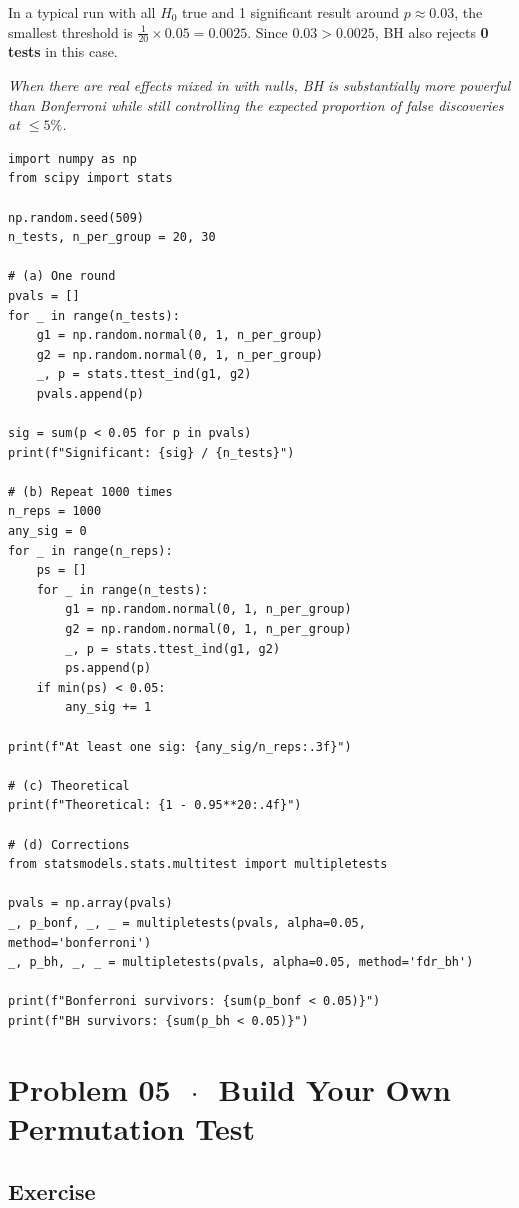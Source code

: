 \documentclass[11pt]{article}
\begin{document}
In a typical run with all $H_0$ true and 1 significant result around $p \approx 0.03$, the smallest threshold is $\frac{1}{20} \times 0.05 = 0.0025$. Since $0.03 > 0.0025$, BH also rejects \textbf{0 tests} in this case.

\textit{When there are real effects mixed in with nulls, BH is substantially more powerful than Bonferroni while still controlling the expected proportion of false discoveries at $\leq 5\%$.}

\begin{lstlisting}[style=python]
import numpy as np
from scipy import stats

np.random.seed(509)
n_tests, n_per_group = 20, 30

# (a) One round
pvals = []
for _ in range(n_tests):
    g1 = np.random.normal(0, 1, n_per_group)
    g2 = np.random.normal(0, 1, n_per_group)
    _, p = stats.ttest_ind(g1, g2)
    pvals.append(p)

sig = sum(p < 0.05 for p in pvals)
print(f"Significant: {sig} / {n_tests}")

# (b) Repeat 1000 times
n_reps = 1000
any_sig = 0
for _ in range(n_reps):
    ps = []
    for _ in range(n_tests):
        g1 = np.random.normal(0, 1, n_per_group)
        g2 = np.random.normal(0, 1, n_per_group)
        _, p = stats.ttest_ind(g1, g2)
        ps.append(p)
    if min(ps) < 0.05:
        any_sig += 1

print(f"At least one sig: {any_sig/n_reps:.3f}")

# (c) Theoretical
print(f"Theoretical: {1 - 0.95**20:.4f}")

# (d) Corrections
from statsmodels.stats.multitest import multipletests

pvals = np.array(pvals)
_, p_bonf, _, _ = multipletests(pvals, alpha=0.05, method='bonferroni')
_, p_bh, _, _ = multipletests(pvals, alpha=0.05, method='fdr_bh')

print(f"Bonferroni survivors: {sum(p_bonf < 0.05)}")
print(f"BH survivors: {sum(p_bh < 0.05)}")
\end{lstlisting}

\section*{Problem 05 \texorpdfstring{$\,\cdot\,$}{-} Build Your Own Permutation Test}

\subsection*{Exercise}
\end{document}
